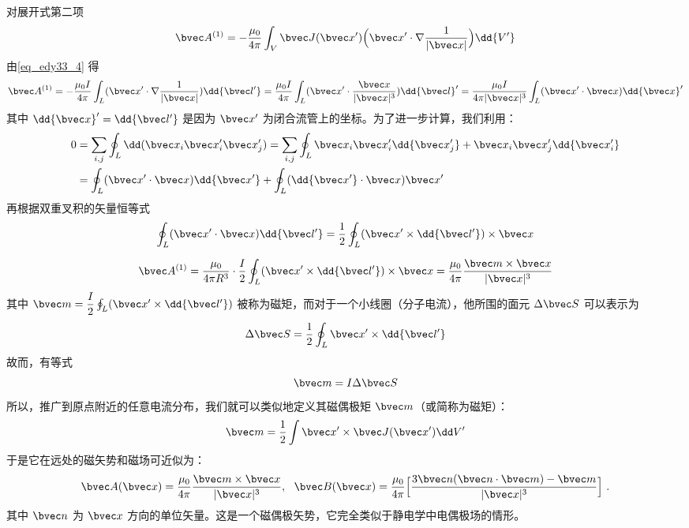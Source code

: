 对展开式第二项
\begin{equation}
\bvec A^{(1)}=-\dfrac{\mu_0 }{4\pi}\int_V \bvec J(\bvec x^{\prime})\Big (\bvec x^{\prime}\cdot\nabla\dfrac{1}{|\bvec x|}\Big)\dd{V^{\prime}}\label{eq_edy33_6}
\end{equation}
由\autoref{eq_edy33_4} 得
\begin{equation}
\bvec A^{(1)}=-\dfrac{\mu_0 I }{4\pi}\int_L (\bvec x^{\prime}\cdot\nabla\dfrac{1}{|\bvec x|}) \dd{\bvec l'}=\dfrac{\mu_0 I }{4\pi}\int_L (\bvec x^{\prime}\cdot\dfrac{\bvec x}{|\bvec x|^3})\dd {\bvec l}^{\prime}
=\dfrac{\mu_0 I }{4\pi|\bvec x|^3}\int_L (\bvec x^{\prime}\cdot \bvec x)\dd {\bvec x}^{\prime}
\label{eq_edy33_7}
\end{equation}
其中 $\dd{\bvec x}^{\prime}=\dd{\bvec l'}$ 是因为 $ \bvec x^{\prime}$ 为闭合流管上的坐标。为了进一步计算，我们利用：
\begin{equation}\label{eq_edy33_8}
\begin{aligned}
0&=\sum_{i,j}\oint_L \dd(\bvec x_i \bvec x'_i \bvec x'_j)=\sum_{i,j}\oint_L \bvec x_i \bvec x'_i \dd {\bvec x'_j} + \bvec x_i \bvec x'_j \dd {\bvec x'_i}\\
&=
\oint_L (\bvec x^{\prime}\cdot\bvec x)\dd {\bvec x'}+\oint_L (\dd {\bvec x'}\cdot \bvec x)\bvec x^{\prime}
\end{aligned}
\end{equation}
再根据双重叉积的矢量恒等式
\begin{equation}
\oint_L (\bvec x^{\prime}\cdot \bvec x)\dd{\bvec l'}=\dfrac1 2\oint_L (\bvec x^{\prime}\times \dd{\bvec l'})\times \bvec x \label{eq_edy33_9}
\end{equation}

\begin{equation}
\bvec A^{(1)}=\dfrac{\mu_0}{4\pi R^3}\cdot\dfrac{I}{2}\oint_L (\bvec x^{\prime}\times \dd{\bvec l'})\times \bvec x=\dfrac{\mu_0}{4\pi}\dfrac{\bvec m \times \bvec x}{|\bvec x|^3}\label{eq_edy33_10}
\end{equation}
其中 $\bvec m =\dfrac{I}{2}\oint_L (\bvec x^{\prime}\times \dd{\bvec l'})$ 被称为磁矩，而对于一个小线圈（分子电流），他所围的面元 $\Delta\bvec S$ 可以表示为
\begin{equation}
\Delta\bvec S=\dfrac 1 2\oint_L \bvec x^{\prime}\times \dd{\bvec l'}
\end{equation}
故而，有等式
\begin{equation}
\bvec m=I\Delta \bvec S
\end{equation}
所以，推广到原点附近的任意电流分布，我们就可以类似地定义其磁偶极矩 $\bvec m$（或简称为磁矩）：
\begin{equation}
\bvec m=\frac{1}{2}\int \bvec x' \times \bvec J(\bvec x') \dd V'
\end{equation}
于是它在远处的磁矢势和磁场可近似为：
\begin{equation}
\bvec A(\bvec x)=\frac{\mu_0}{4\pi}\frac{\bvec m\times \bvec x}{|\bvec x|^3},\ \ 
\bvec B(\bvec x)=\frac{\mu_0}{4\pi}\Big [\frac{3\bvec n(\bvec n\cdot \bvec m)-\bvec m}{|\bvec x|^3}\Big]~.
\end{equation}
其中 $\bvec n$ 为 $\bvec x$ 方向的单位矢量。这是一个磁偶极矢势，它完全类似于静电学中电偶极场的情形。